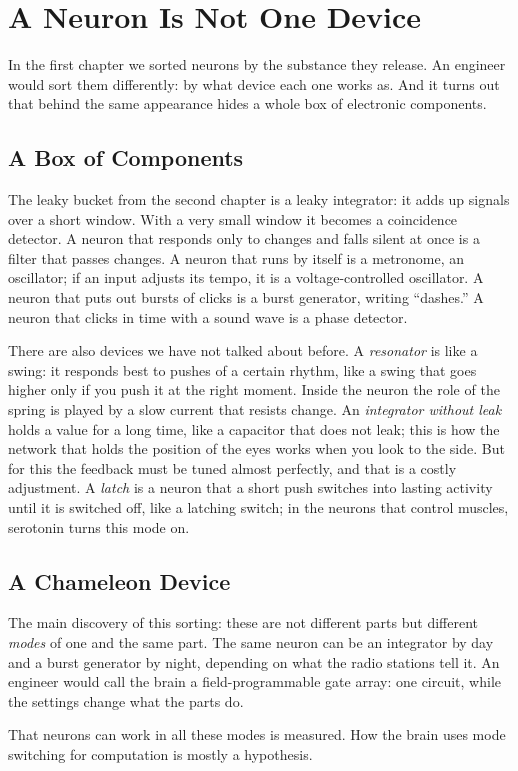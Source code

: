 \chapter{A Neuron Is Not One Device}

In the first chapter we sorted neurons by the substance they release. An engineer would sort them differently: by what device each one works as. And it turns out that behind the same appearance hides a whole box of electronic components.

\section*{A Box of Components}

The leaky bucket from the second chapter is a leaky integrator: it adds up signals over a short window. With a very small window it becomes a coincidence detector. A neuron that responds only to changes and falls silent at once is a filter that passes changes. A neuron that runs by itself is a metronome, an oscillator; if an input adjusts its tempo, it is a voltage-controlled oscillator. A neuron that puts out bursts of clicks is a burst generator, writing ``dashes.'' A neuron that clicks in time with a sound wave is a phase detector.


There are also devices we have not talked about before. A \emph{resonator} is like a swing: it responds best to pushes of a certain rhythm, like a swing that goes higher only if you push it at the right moment. Inside the neuron the role of the spring is played by a slow current that resists change. An \emph{integrator without leak} holds a value for a long time, like a capacitor that does not leak; this is how the network that holds the position of the eyes works when you look to the side. But for this the feedback must be tuned almost perfectly, and that is a costly adjustment. A \emph{latch} is a neuron that a short push switches into lasting activity until it is switched off, like a latching switch; in the neurons that control muscles, serotonin turns this mode on.

\section*{A Chameleon Device}

The main discovery of this sorting: these are not different parts but different \emph{modes} of one and the same part. The same neuron can be an integrator by day and a burst generator by night, depending on what the radio stations tell it. An engineer would call the brain a field-programmable gate array: one circuit, while the settings change what the parts do.

That neurons can work in all these modes is measured. How the brain uses mode switching for computation is mostly a hypothesis.

